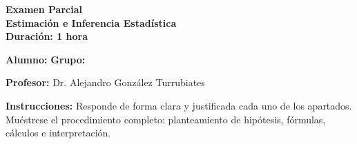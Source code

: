 \documentclass[11pt,a4paper]{exam}
\begin{document}
\begin{center}
    \Large \textbf{Examen Parcial}\\
    \large \textbf{Estimación e Inferencia Estadística}\\[0.2cm]
    \textbf{Duración: 1 hora}
\end{center}
\hrulefill

\vspace{0.5cm}
\noindent \textbf{Alumno:} \underline{\hspace{8cm}} \hfill \textbf{Grupo:} \underline{\hspace{3cm}}

\noindent \textbf{Profesor:} Dr. Alejandro González Turrubiates

\vspace{0.5cm}

\textbf{Instrucciones:}
Responde de forma clara y justificada cada uno de los apartados. Muéstrese el procedimiento completo: planteamiento de hipótesis, fórmulas, cálculos e interpretación.
\end{document}
